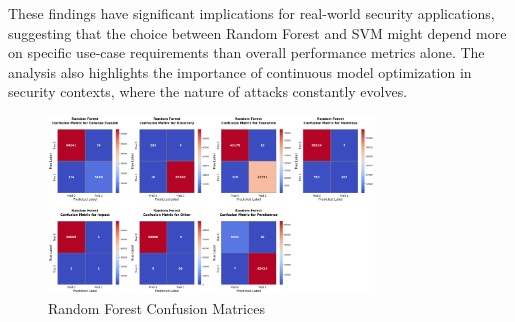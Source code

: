         These findings have significant implications for real-world security applications, suggesting that the choice between Random Forest and SVM might depend more on specific use-case requirements than overall performance metrics alone. The analysis also highlights the importance of continuous model optimization in security contexts, where the nature of attacks constantly evolves.
        
        
        
        
        \clearpage

        
        \begin{figure}[H]
        
            \centering
            
            \begin{minipage}{\textwidth}
                \centering
                \begin{minipage}[c]{\textwidth}
                    \centering
                    \includegraphics[width=0.77\textwidth]{../figures/plots/section2/Random_Forest_normalized_confusion_matrix_test.png}
                    \caption{Random Forest Confusion Matrices}
                    \label{fig:rf_cm_base}
                \end{minipage}%
            \end{minipage}

            \vspace{0.5cm}  %
            

\end{figure}

